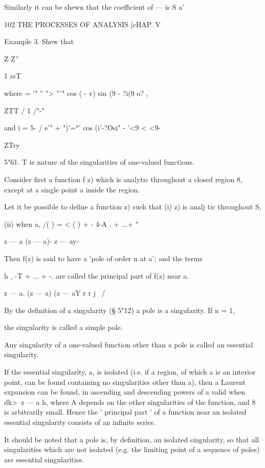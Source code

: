 {{{{Similarly it can be shewn that the coefficient of — is S a'\



102 THE PROCESSES OF ANALYSIS [cHAP. V

Example 3. Shew that

Z Z''

1 rsT

where = '" '' "> '''" cos ( - v) sin (9 - ?i(9 o? ,

ZTT / 1 /"-"

and i = 5- / e'" + ")'=°' cos (i'-?Osi" - '<9 < <9-

ZTry

5"61. T ie nature of the singularities of one-valued functions.

Consider first a function f z) which is analytic throughout a closed
region 8, except at a single point a inside the region.

Let it be possible to define a function z) such that (i) z) is analj
tic throughout S,

(ii) when a, /( ) = < ( ) + - 4-A . + ...+ "



z — a (z — a)- z — ay-

Then f(z) is said to have a 'pole of order n at a'; and the terms

h , -T + ... + -. are called the principal part of f(z) near a.

z — a. (z — a) (z — aY r r j \ /

By the definition of a singularity (§ 5"12) a pole is a singularity.
If n = 1,

the singularity is called a simple pole.

Any singularity of a one-valued function other than a pole is called
an essential singularity.

If the essential singularity, a, is isolated (i.e. if a region, of
which a is an interior point, can be found containing no singularities
other than a), then a Laurent expansion can be found, in ascending and
descending powers of a valid when dk>\ z — a h, where A depends on the
other singularities of the function, and 8 is arbitrarily small. Hence
the ' principal part ' of a function near an isolated essential
singularity consists of an infinite series.

It should be noted that a pole is, by definition, an isolated
singularity, so that all singularities which are not isolated (e.g.
the limiting point of a sequence of poles) are essential
singularities.

}}}}
